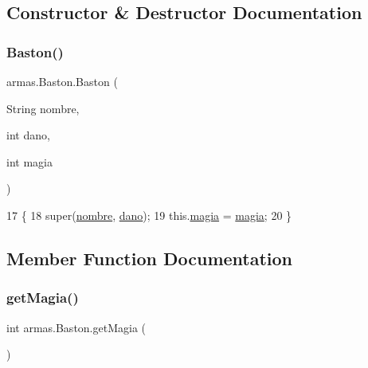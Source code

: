 \subsection{Constructor \& Destructor Documentation}
\mbox{\label{classarmas_1_1_baston_adee851d9bd8ee95ce79b2b5c3087bcad}} 
\subsubsection{\texorpdfstring{Baston()}{Baston()}}
{\footnotesize\ttfamily armas.\+Baston.\+Baston (\begin{DoxyParamCaption}\item[{String}]{nombre,  }\item[{int}]{dano,  }\item[{int}]{magia }\end{DoxyParamCaption})\hspace{0.3cm}{\ttfamily [inline]}}


\begin{DoxyCode}
17     \{
18         super(\mbox{\hyperlink{classarmas_1_1_arma_abdd717c561a99a3436dbfda8129b5581}{nombre}}, \mbox{\hyperlink{classarmas_1_1_arma_a59396ee4b222360f19c8be08eb7d137b}{dano}});
19         this.\mbox{\hyperlink{classarmas_1_1_baston_a36ffe8a19130123c5ef91918c2a5c2db}{magia}} = \mbox{\hyperlink{classarmas_1_1_baston_a36ffe8a19130123c5ef91918c2a5c2db}{magia}};
20     \}
\end{DoxyCode}


\subsection{Member Function Documentation}
\mbox{\label{classarmas_1_1_baston_a40e5bbca49357a1b4a4cd4e010281a9c}} 
\subsubsection{\texorpdfstring{get\+Magia()}{getMagia()}}
{\footnotesize\ttfamily int armas.\+Baston.\+get\+Magia (\begin{DoxyParamCaption}{ }\end{DoxyParamCaption})\hspace{0.3cm}{\ttfamily [inline]}}


